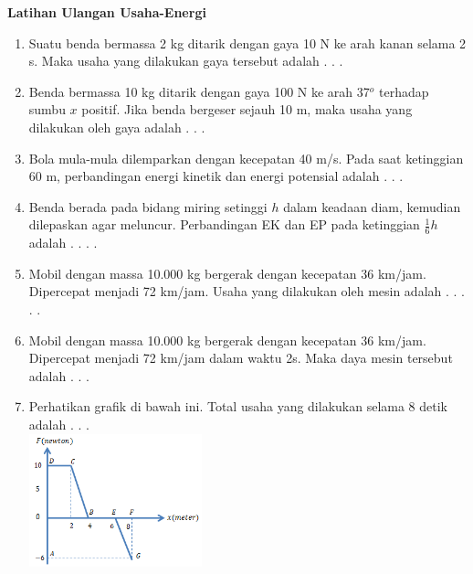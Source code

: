 \documentclass[10pt,a4paper]{extarticle}
\begin{document}
 \textbf{Latihan Ulangan Usaha-Energi} \phantom{ini nama siswa yang aaamengerjakan soal kuis ini }  

\begin{multicols*}{2}

\begin{enumerate}
\item Suatu benda bermassa 2 kg ditarik dengan gaya 10 N ke arah kanan selama 2 s. Maka usaha yang dilakukan gaya tersebut adalah . . .
\vspace{3cm}

\item Benda bermassa 10 kg ditarik dengan gaya 100 N ke arah 37$^o$ terhadap sumbu $x$ positif. Jika benda bergeser sejauh 10 m, maka usaha yang dilakukan oleh gaya adalah . . .
\vspace{3cm}


\item Bola mula-mula dilemparkan dengan kecepatan 40 m/s. Pada saat ketinggian 60 m, perbandingan energi kinetik dan energi potensial adalah . . .
\vspace{3cm}


\item Benda berada pada bidang miring setinggi $h$ dalam keadaan diam, kemudian dilepaskan agar meluncur. Perbandingan EK dan EP pada ketinggian $\frac{1}{6}h$ adalah . . . .
\vspace{3.5cm}


\item Mobil dengan massa 10.000 kg bergerak dengan kecepatan 36 km/jam. Dipercepat menjadi 72 km/jam. Usaha yang dilakukan oleh mesin adalah . . . . . 
\vspace{3cm}

\item Mobil dengan massa 10.000 kg bergerak dengan kecepatan 36 km/jam. Dipercepat menjadi 72 km/jam dalam waktu 2s. Maka daya mesin tersebut adalah . . . 
\vspace{2cm}



\item Perhatikan grafik di bawah ini. Total usaha yang dilakukan selama 8 detik adalah . . .\\
\includegraphics[width=5cm]{pic/latul-usaha4} 
\vspace{2cm}



\end{enumerate}
\end{multicols*}
\end{document}
